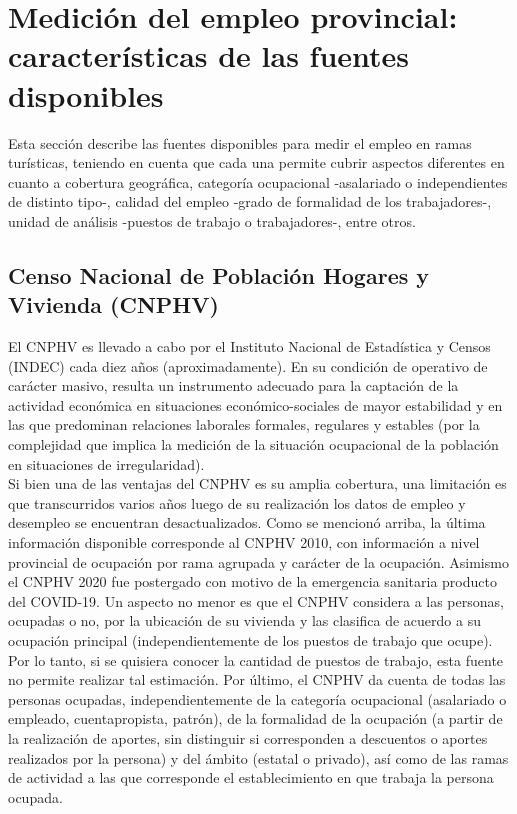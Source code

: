 \documentclass[
  openany]{book}
\begin{document}
\hypertarget{mediciuxf3n-del-empleo-provincial-caracteruxedsticas-de-las-fuentes-disponibles}{%
\section{Medición del empleo provincial: características de las fuentes disponibles}\label{mediciuxf3n-del-empleo-provincial-caracteruxedsticas-de-las-fuentes-disponibles}}

Esta sección describe las fuentes disponibles para medir el empleo en ramas turísticas, teniendo en cuenta que cada una permite cubrir aspectos diferentes en cuanto a cobertura geográfica, categoría ocupacional -asalariado o independientes de distinto tipo-, calidad del empleo -grado de formalidad de los trabajadores-, unidad de análisis -puestos de trabajo o trabajadores-, entre otros.

\hypertarget{censo-nacional-de-poblaciuxf3n-hogares-y-vivienda-cnphv}{%
\subsection{Censo Nacional de Población Hogares y Vivienda (CNPHV)}\label{censo-nacional-de-poblaciuxf3n-hogares-y-vivienda-cnphv}}

El CNPHV es llevado a cabo por el Instituto Nacional de Estadística y Censos (INDEC) cada diez años (aproximadamente).
En su condición de operativo de carácter masivo, resulta un instrumento adecuado para la captación de la actividad económica en situaciones económico-sociales de mayor estabilidad y en las que predominan relaciones laborales formales, regulares y estables (por la complejidad que implica la medición de la situación ocupacional de la población en situaciones de irregularidad).\\
Si bien una de las ventajas del CNPHV es su amplia cobertura, una limitación es que transcurridos varios años luego de su realización los datos de empleo y desempleo se encuentran desactualizados.
Como se mencionó arriba, la última información disponible corresponde al CNPHV 2010, con información a nivel provincial de ocupación por rama agrupada y carácter de la ocupación.
Asimismo el CNPHV 2020 fue postergado con motivo de la emergencia sanitaria producto del COVID-19.
Un aspecto no menor es que el CNPHV considera a las personas, ocupadas o no, por la ubicación de su vivienda y las clasifica de acuerdo a su ocupación principal (independientemente de los puestos de trabajo que ocupe).
Por lo tanto, si se quisiera conocer la cantidad de puestos de trabajo, esta fuente no permite realizar tal estimación.
Por último, el CNPHV da cuenta de todas las personas ocupadas, independientemente de la categoría ocupacional (asalariado o empleado, cuentapropista, patrón), de la formalidad de la ocupación (a partir de la realización de aportes, sin distinguir si corresponden a descuentos o aportes realizados por la persona) y del ámbito (estatal o privado), así como de las ramas de actividad a las que corresponde el establecimiento en que trabaja la persona ocupada.
\end{document}
